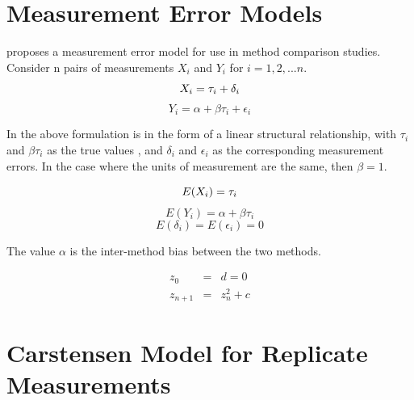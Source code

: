 \documentclass[12pt, a4paper]{report}
\theoremstyle{plain}
\theoremstyle{definition}
\theoremstyle{remark}
\begin{document}
\section{Measurement Error Models}
\citet{DunnSEME} proposes a measurement error model for use in
method comparison studies. Consider n pairs of measurements
$X_{i}$ and $Y_{i}$ for $i=1,2,...n$.
\begin{equation}
X_{i} = \tau_{i}+\delta_{i}\\
\end{equation}
\begin{equation}
Y_{i} = \alpha +\beta\tau_{i}+\epsilon_{i} \nonumber
\end{equation}

In the above formulation is in the form of a linear structural
relationship, with $\tau_{i}$ and $\beta\tau_{i}$ as the true
values , and $\delta_{i}$ and $\epsilon_{i}$ as the corresponding
measurement errors. In the case where the units of measurement are
the same, then $\beta =1$.

\begin{equation}
E(X_{i}) = \tau_{i}\\
\end{equation}
\begin{equation}
E(Y_{i}) = \alpha +\beta\tau_{i} \nonumber
\end{equation}
\begin{equation}
E(\delta_{i}) = E(\epsilon_{i}) = 0 \nonumber
\end{equation}

The value $\alpha$ is the inter-method bias between the two
methods.

\begin{eqnarray}
z_0 &=& d = 0 \\
z_{n+1} &=& z_n^2+c
\end{eqnarray}




\section{Carstensen Model for Replicate Measurements}
\end{document}
